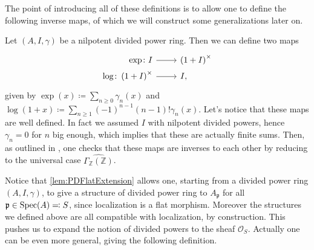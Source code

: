 \noindent
The point of introducing all of these definitions is to allow one to define the following
inverse maps, of which we will construct some generalizations later on.
\begin{defn}[]\label{defn:PDExponential}
	Let $\left(A, I, \gamma\right)$ be a nilpotent divided power ring.
	Then we can define two maps
	\begin{equation*}
	\begin{tikzcd}[row sep = 0ex
		,/tikz/column 1/.append style={anchor=base east}
		,/tikz/column 2/.append style={anchor=base west}]
		\exp\colon I \arrow[r, "", rightarrow] &
		\left( 1 + I \right)^{\times}\\
		\log\colon \left( 1 + I \right)^{\times} \arrow[r, "", rightarrow] &
		I
	,\end{tikzcd}
	\end{equation*} 
	given by 
	$\exp (x) \coloneqq \sum_{n\geq 0} \gamma_n(x)$
	and $\log (1+x) \coloneqq \sum_{n\geq 1} 
	(-1)^{n-1} \left( n-1 \right)! \gamma_n(x)$.
	Let's notice that these maps are well defined.
	In fact we assumed $I$ with nilpotent divided powers,
	hence $\gamma_n = 0$ for $n$ big enough, which implies that
	these are actually finite sums.
	Then, as outlined in \cite[Chapter III, \S1.6]{Messing},
	one checks that these maps are inverses to each other
	by reducing to the universal case $\widehat{\Gamma_{\mathbb{Z}}(\mathbb{Z})}$.
\end{defn}


\begin{rem}[]
	Notice that \cref{lem:PDFlatExtension} allows one, starting from
	a divided power ring $\left(A, I, \gamma\right)$, to give
	a structure of divided power ring to $A_{\mathfrak{p}}$ for all
	$\mathfrak{p} \in \operatorname{Spec}(A) \eqqcolon S$, since localization is a flat morphism.
	Moreover the structures we defined above are all compatible with localization, by construction.
	This pushes us to expand the notion of divided powers to the
	sheaf $\mathcal{O}_{ S }$.
	Actually one can be even more general, giving the following definition.
\end{rem}



